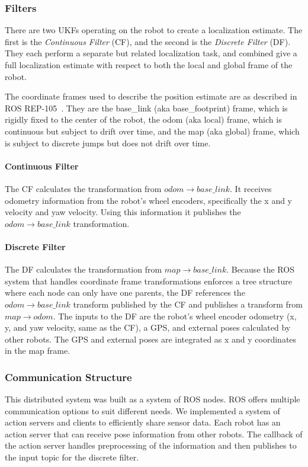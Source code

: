 \documentclass[conference]{IEEEtran}
\begin{document}
\subsubsection{Filters}
There are two UKFs operating on the robot to create a localization estimate. The first is the \textit{Continuous Filter} (CF), and the second is the \textit{Discrete Filter} (DF). They each perform a separate but related localization task, and combined give a full localization estimate with respect to both the local and global frame of the robot.

The coordinate frames used to describe the position estimate are as described in ROS REP-105~\cite{REP_105}. They are the base\_link (aka base\_footprint) frame, which is rigidly fixed to the center of the robot, the odom (aka local) frame, which is continuous but subject to drift over time, and the map (aka global) frame, which is subject to discrete jumps but does not drift over time.

\paragraph{Continuous Filter} \label{con_filter_subsubsection}
The CF calculates the transformation from $odom \rightarrow base\_link$. It receives odometry information from the robot's wheel encoders, specifically the x and y velocity and yaw velocity. Using this information it publishes the $odom \rightarrow base\_link$ transformation.

\paragraph{Discrete Filter} \label{disc_filter_subsubsection}
The DF calculates the transformation from $map \rightarrow base\_link$. Because the ROS system that handles coordinate frame transformations enforces a tree structure where each node can only have one parents, the DF references the $odom \rightarrow base\_link$ transform published by the CF and publishes a transform from $map \rightarrow odom$. The inputs to the DF are the robot's wheel encoder odometry (x, y, and yaw velocity, same as the CF), a GPS, and external poses calculated by other robots. The GPS and external poses are integrated as x and y coordinates in the map frame.

\subsubsection{Communication Structure}
This distributed system was built as a system of ROS nodes. ROS offers multiple communication options to suit different needs. We implemented a system of action servers and clients to efficiently share sensor data. Each robot has an action server that can receive pose information from other robots. The callback of the action server handles preprocessing of the information and then publishes to the input topic for the discrete filter.
\end{document}
